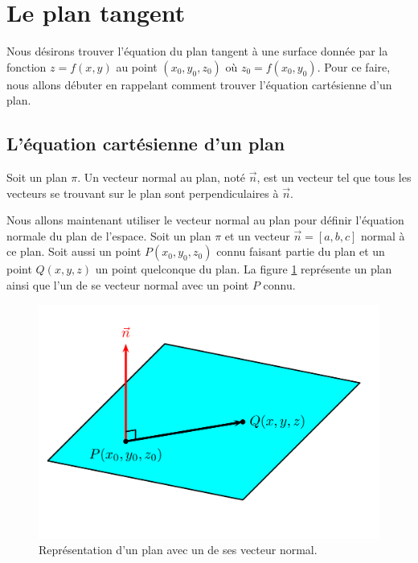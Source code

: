 \documentclass[]{book}
\theoremstyle{definition}
\theoremstyle{definition}
\theoremstyle{definition}
\theoremstyle{remark}
\let\BeginKnitrBlock\begin \let\EndKnitrBlock\end
\begin{document}
\hypertarget{le-plan-tangent}{%
\section{Le plan tangent}\label{le-plan-tangent}}

Nous désirons trouver l'équation du plan tangent à une surface donnée
par la fonction \(z=f(x,y)\) au point \((x_0,y_0,z_0)\) où
\(z_0=f(x_0,y_0)\). Pour ce faire, nous allons débuter en rappelant
comment trouver l'équation cartésienne d'un plan.

\hypertarget{lequation-cartesienne-dun-plan}{%
\subsection{L'équation cartésienne d'un
plan}\label{lequation-cartesienne-dun-plan}}

\BeginKnitrBlock{definition}[Le vecteur normal à un plan]
\protect\hypertarget{def:unnamed-chunk-169}{}{\label{def:unnamed-chunk-169}
{} }Soit un plan \(\pi\). Un
vecteur normal au plan, noté \(\overrightarrow{n}\), est un vecteur tel
que tous les vecteurs se trouvant sur le plan sont perpendiculaires à
\(\overrightarrow{n}\).
\EndKnitrBlock{definition}

Nous allons maintenant utiliser le vecteur normal au plan pour définir
l'équation normale du plan de l'espace. Soit un plan \(\pi\) et un
vecteur \(\overrightarrow{n}=[a,b,c]\) normal à ce plan. Soit aussi un
point \(P(x_0,y_0,z_0)\) connu faisant partie du plan et un point
\(Q(x,y,z)\) un point quelconque du plan. La figure
\ref{fig:eq-cartesienne-plan} représente un plan ainsi que l'un de se
vecteur normal avec un point \(P\) connu.

\begin{figure}

{\centering \includegraphics[width=0.75\linewidth]{resources/images/latex/eqcartesienneplan} 

}

\caption{Représentation d'un plan avec un de ses vecteur normal.}\label{fig:eq-cartesienne-plan}
\end{figure}
\end{document}
